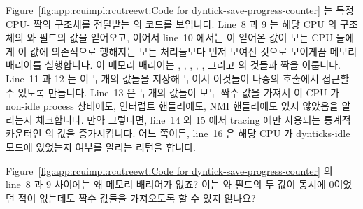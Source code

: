 Figure~\ref{fig:app:rcuimpl:rcutreewt:Code for dyntick-save-progress-counter}
는 특정 CPU- 짝의  구조체를 전달받는
 의 코드를 보입니다.
Line~8 과 9 는 해당 CPU 의  구조체의  와
 필드의 값을 얻어오고, 이어서 line~10 에서는 이 얻어온 값이
모든 CPU 들에게 이 값에 의존적으로 행해지는 모든 처리들보다 먼저 보여진 것으로
보이게끔 메모리 배리어를 실행합니다.
이 메모리 배리어는 , ,
, , , 그리고
 의 것들과 짝을 이룹니다.
Line~11 과 12 는 이 두개의 값들을 저장해 두어서 이것들이 나중의
 호출에서 접근할 수 있도록 만듭니다.
Line~13 은 두개의 값들이 모두 짝수 값을 가져서 이 CPU 가 non-idle process
상태에도, 인터럽트 핸들러에도, NMI 핸들러에도 있지 않았음을 알리는지
체크합니다.
만약 그렇다면, line~14 와 15 에서 tracing 에만 사용되는 통계적 카운터인
 의 값을 증가시킵니다.
어느 쪽이든, line~16 은 해당 CPU 가 dynticks-idle 모드에 있었는지 여부를 알리는
리턴을 합니다.
\iffalse

Figure~\ref{fig:app:rcuimpl:rcutreewt:Code for dyntick-save-progress-counter}
shows the code for \co{dyntick_save_progress_counter()}, which
is passed a given CPU-\co{rcu_state} pair's \co{rcu_data} structure.
Lines~8 and 9 take snapshots of the CPU's \co{rcu_dynticks} structure's
\co{->dynticks} and \co{->dynticks_nmi} fields,
and then line~10 executes a memory barrier to ensure that the snapshot
is seen by all CPUs to have happened before any later processing
depending on these values.
This memory barrier pairs up with those in \co{rcu_enter_nohz()},
\co{rcu_exit_nohz()}, \co{rcu_nmi_enter()}, \co{rcu_nmi_exit()},
\co{rcu_irq_enter()}, and \co{rcu_irq_exit()}.
Lines~11 and 12 store these two snapshots away so that they can be
accessed by a later call to \co{rcu_implicit_dynticks_qs()}.
Line~13 checks to see if both snapshots have even-numbered values,
indicating that the CPU in question was in neither non-idle process
state, an interrupt handler, nor an NMI handler.
If so, lines~14 and 15 increment the statistical counter
\co{->dynticks_fqs}, which is used only for tracing.
Either way, line~16 returns the indication of whether the CPU was
in dynticks-idle mode.
\fi

\QuickQuiz{}
	Figure~\ref{fig:app:rcuimpl:rcutreewt:Code for dyntick-save-progress-counter}
	의 line~8 과 9 사이에는 왜 메모리 배리어가 없죠?
	이는  와  필드의 두 값이 동시에
	0이었던 적이 없는데도 짝수 값들을 가져오도록 할 수 있지 않나요?
	\iffalse

